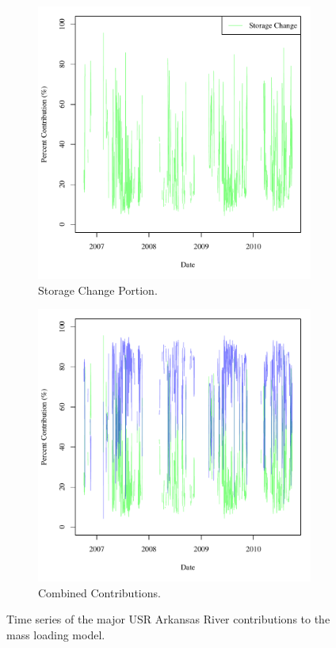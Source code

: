 \begin{linenumbers}
\begin{figure}[htbp]
\begin{subfigure}{0.5\textwidth}
		\includegraphics[width=\tableCustomSize]{"Figures/Results_USR/Stochastic/M Mass Contrib 2"}
		\caption{Storage Change Portion.}
	\end{subfigure}
	\tablevspace
	\begin{subfigure}{0.5\textwidth}
		\centering
		\includegraphics[width=\tableCustomSize]{"Figures/Results_USR/Stochastic/M Mass Contrib 3"}
		\caption{Combined Contributions.}
	\end{subfigure}
	\caption[Time series of the major USR Arkansas River contributions to the mass loading model.]{Time series of the major USR Arkansas River contributions to the mass loading model.}
	\label{fig:USRMassContrib}
\end{figure}


\end{linenumbers}
